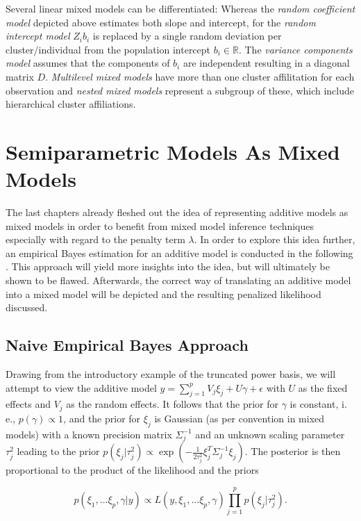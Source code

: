 \documentclass[12pt]{article}
\begin{document}
Several linear mixed models can be differentiated:
Whereas the \textit{random coefficient model} depicted above estimates both slope and intercept, for the \textit{random intercept model} $Z_ib_i$ is replaced by a single random deviation per cluster/individual from the population intercept $b_i \in \mathbb{R}$. The \textit{variance components model} assumes that the components of $b_i$ are independent resulting in a diagonal matrix $D$.
\textit{Multilevel mixed models} have more than one cluster affilitation for each observation and \textit{nested mixed models} represent a  subgroup of these, which include hierarchical cluster affiliations.


\section{Semiparametric Models As Mixed Models}\label{representation} %


The last chapters already fleshed out the idea of representing additive models as mixed models in order to benefit from mixed model inference techniques especially with regard to the penalty term $\lambda$. In order to explore this idea further, an empirical Bayes estimation for an additive model is conducted in the following \cite{kneib2006mixed}. This approach will yield more insights into the idea, but will ultimately be shown to be flawed. Afterwards, the correct way of translating an additive model into a mixed model will be depicted and the resulting penalized likelihood discussed.

\subsection{Naive Empirical Bayes Approach}

Drawing from the introductory example of the truncated power basis, we will attempt to view the additive model $y = \sum_{j=1}^p V_j \xi_j + U \gamma + \epsilon$ with $U$ as the fixed effects and $V_j$ as the random effects. It follows that the prior for $\gamma$ is constant, i.\,e., $p(\gamma) \propto 1$, and the prior for $\xi_j$ is Gaussian (as per convention in mixed models) with a known precision matrix $\Sigma^{-1}_j$ and an unknown scaling parameter $\tau^2_j$ leading to the prior $p(\xi_j|\tau_j^2)  \propto \exp\left(-\frac{1}{2\tau^2_j} \xi_j^T\Sigma^{-1}_j \xi_j\right) $. The posterior is then proportional to the product of the likelihood and the priors

$$p(\xi_1, ... \xi_p, \gamma|y) \propto L(y,\xi_1, ... \xi_p, \gamma)\prod_{j=1}^p p(\xi_j|\tau_j^2). $$
\end{document}
